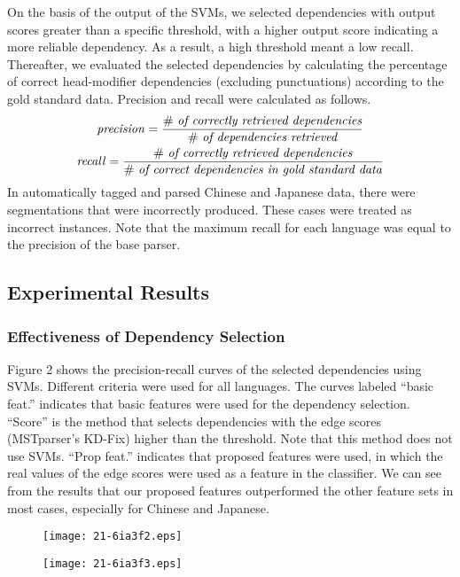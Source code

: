 \documentclass[english]{jnlp_1.4}
\begin{document}
On the basis of the output of the SVMs, we selected
dependencies with output scores greater than a specific threshold, with a higher output score indicating a more reliable dependency.
As a result, a high threshold meant a low recall. Thereafter, we
evaluated the selected dependencies by calculating the percentage of correct
head-modifier dependencies (excluding punctuations) according to the gold standard
data. Precision and recall were calculated as follows. 
\begin{gather*}
 \mathit{precision} = \frac{\#\ \text{\itshape of correctly retrieved dependencies}}{\#\ \text{\itshape of dependencies retrieved}} \\
 \mathit{recall} = \frac{\#\ \text{\itshape of correctly retrieved dependencies}}{\#\ \text{\itshape of correct dependencies in gold standard data}}
\end{gather*}
In automatically tagged and parsed Chinese and Japanese data, there were segmentations that were incorrectly produced.
These cases were treated as incorrect instances. Note that the maximum recall for each language was equal to the precision of the base parser.


\subsection{Experimental Results}

\subsubsection{Effectiveness of Dependency Selection }

Figure 2 shows the precision-recall curves of the selected dependencies
using SVMs. Different criteria were used for all languages.
The curves labeled ``basic feat.'' indicates that basic features were used for the dependency selection.
``Score'' is the method that selects dependencies with the edge scores (MSTparser's KD-Fix) higher than the threshold.
Note that this method does not use SVMs. ``Prop feat.'' indicates that proposed features were used, in which the real values of the edge scores were used as a feature in the classifier. We can see from the results that our proposed features outperformed the other feature sets in most cases, especially for Chinese and Japanese.

\begin{figure}[t]
\begin{center}
\texttt{[image: 21-6ia3f2.eps]}
\end{center}
\end{figure}
\begin{figure}[t]
\begin{center}
\texttt{[image: 21-6ia3f3.eps]}
\end{center}
\end{figure}
\end{document}
